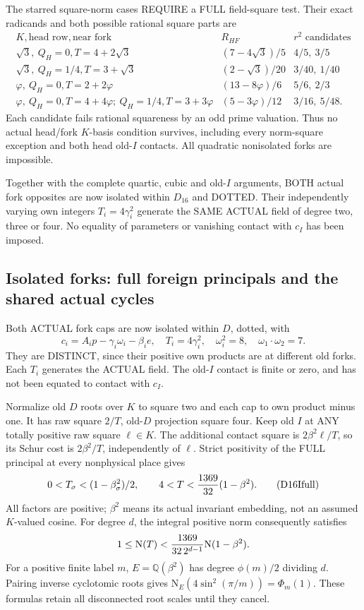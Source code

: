 The starred square-norm cases REQUIRE
a FULL field-square test.
Their exact radicands and both possible
rational square parts are
\[
\begin{array}{c|c|c}
 K,\text{head row},\text{near fork}&R_{HF}&r^2\text{ candidates}\\ \hline
 \sqrt3,\ Q_H=0,T=4+2\sqrt3&(7-4\sqrt3)/5&4/5,\ 3/5\\
 \sqrt3,\ Q_H=1/4,T=3+\sqrt3&(2-\sqrt3)/20&3/40,\ 1/40\\
 \varphi,\ Q_H=0,T=2+2\varphi&(13-8\varphi)/6&5/6,\ 2/3\\
 \varphi,\ Q_H=0,T=4+4\varphi;\
 Q_H=1/4,T=3+3\varphi&(5-3\varphi)/12&3/16,\ 5/48 .
\end{array}
\]
Each candidate fails rational squareness
by an odd prime valuation.
Thus no actual head/fork \(K\)-basis
condition survives, including every
norm-square exception and both head
old-\(I\) contacts.
All quadratic nonisolated forks are
impossible.

Together with the complete quartic,
cubic and old-\(I\) arguments, BOTH
actual fork opposites are now isolated
within \(D_{16}\) and DOTTED.
Their independently varying own integers
\(T_i=4\gamma_i^2\) generate the SAME
ACTUAL field of degree two, three
or four.
No equality of parameters or vanishing
contact with \(c_I\) has been imposed.

\subsection{Isolated forks: full foreign principals and the shared actual cycles}
\label{app:arithD16Iisolatedcommon}

Both ACTUAL fork caps are now isolated
within \(D\), dotted, with
\[
            c_i=A_ip-\gamma_i\omega_i-\beta_i e,\quad
            T_i=4\gamma_i^2,\quad\omega_i^2=8,\quad
            \omega_1\cdot\omega_2=7 .
\]
They are DISTINCT, since their positive
own products are at different old forks.
Each \(T_i\) generates the ACTUAL field.
The old-\(I\) contact is finite or zero,
and has not been equated to contact
with \(c_I\).

Normalize old \(D\) roots over \(K\)
to square two and each cap to own
product minus one.
It has raw square \(2/T\), old-\(D\)
projection square four.
Keep old \(I\) at ANY totally positive
raw square \(\ell\in K\).
The additional contact square is
\(2\beta^2\ell/T\), so its Schur cost
is \(2\beta^2/T\), independently of
\(\ell\).
Strict positivity of the FULL principal
at every nonphysical place gives
\[
             0<T_\sigma<(1-\beta_\sigma^2)/2,\qquad
             4<T<{1369\over32}(1-\beta^2).
\tag{D16Ifull}\label{eq:arithD16Iisolatedfull}
\]
All factors are positive; \(\beta^2\)
means its actual invariant embedding,
not an assumed \(K\)-valued cosine.
For degree \(d\), the integral positive
norm consequently satisfies
\[
              1\le\mathrm N(T)<
                   {1369\over32\,2^{d-1}}\mathrm N(1-\beta^2).
\]
For a positive finite label \(m\),
\(E=\mathbb Q(\beta^2)\) has degree
\(\phi(m)/2\) dividing \(d\).
Pairing inverse cyclotomic roots gives
\(\mathrm N_E(4\sin^2(\pi/m))=\Phi_m(1)\).
These formulas retain all disconnected
root scales until they cancel.

